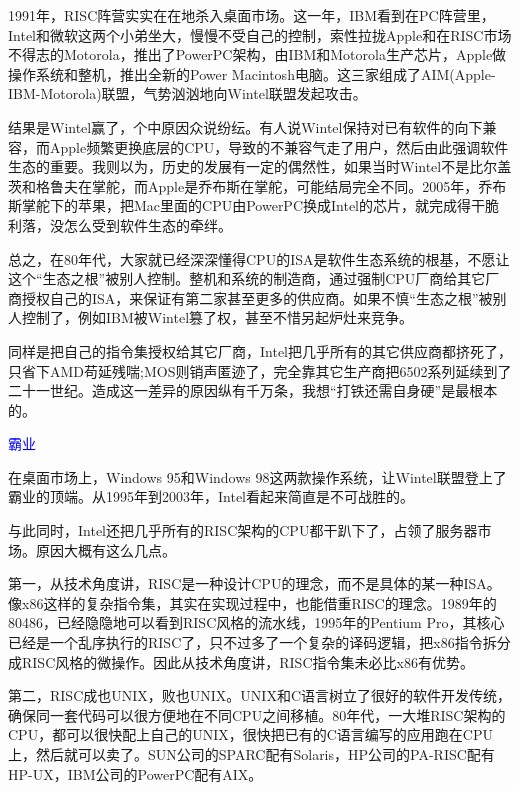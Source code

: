 \documentclass[utf8]{book}
\begin{document}
	1991年，RISC阵营实实在在地杀入桌面市场。这一年，IBM看到在PC阵营里，Intel和微软这两个小弟坐大，慢慢不受自己的控制，索性拉拢Apple和在RISC市场不得志的Motorola，推出了PowerPC架构，由IBM和Motorola生产芯片，Apple做操作系统和整机，推出全新的Power Macintosh电脑。这三家组成了AIM(Apple-IBM-Motorola)联盟，气势汹汹地向Wintel联盟发起攻击。
	
	结果是Wintel赢了，个中原因众说纷纭。有人说Wintel保持对已有软件的向下兼容，而Apple频繁更换底层的CPU，导致的不兼容气走了用户，然后由此强调软件生态的重要。我则以为，历史的发展有一定的偶然性，如果当时Wintel不是比尔盖茨和格鲁夫在掌舵，而Apple是乔布斯在掌舵，可能结局完全不同。2005年，乔布斯掌舵下的苹果，把Mac里面的CPU由PowerPC换成Intel的芯片，就完成得干脆利落，没怎么受到软件生态的牵绊。
	
	总之，在80年代，大家就已经深深懂得CPU的ISA是软件生态系统的根基，不愿让这个“生态之根”被别人控制。整机和系统的制造商，通过强制CPU厂商给其它厂商授权自己的ISA，来保证有第二家甚至更多的供应商。如果不慎“生态之根”被别人控制了，例如IBM被Wintel篡了权，甚至不惜另起炉灶来竞争。
	
	同样是把自己的指令集授权给其它厂商，Intel把几乎所有的其它供应商都挤死了，只省下AMD苟延残喘;MOS则销声匿迹了，完全靠其它生产商把6502系列延续到了二十一世纪。造成这一差异的原因纵有千万条，我想“打铁还需自身硬”是最根本的。
	
	\begin{flushleft}
		{\large \textcolor{blue}{霸业}}
	\end{flushleft}

	在桌面市场上，Windows 95和Windows 98这两款操作系统，让Wintel联盟登上了霸业的顶端。从1995年到2003年，Intel看起来简直是不可战胜的。
	
	与此同时，Intel还把几乎所有的RISC架构的CPU都干趴下了，占领了服务器市场。原因大概有这么几点。
	
	第一，从技术角度讲，RISC是一种设计CPU的理念，而不是具体的某一种ISA。像x86这样的复杂指令集，其实在实现过程中，也能借重RISC的理念。1989年的80486，已经隐隐地可以看到RISC风格的流水线，1995年的Pentium Pro，其核心已经是一个乱序执行的RISC了，只不过多了一个复杂的译码逻辑，把x86指令拆分成RISC风格的微操作。因此从技术角度讲，RISC指令集未必比x86有优势。
	
	第二，RISC成也UNIX，败也UNIX。UNIX和C语言树立了很好的软件开发传统，确保同一套代码可以很方便地在不同CPU之间移植。80年代，一大堆RISC架构的CPU，都可以很快配上自己的UNIX，很快把已有的C语言编写的应用跑在CPU上，然后就可以卖了。SUN公司的SPARC配有Solaris，HP公司的PA-RISC配有HP-UX，IBM公司的PowerPC配有AIX。
	
\end{document}
